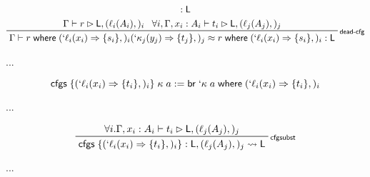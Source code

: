 \documentclass[acmsmall,screen,review]{acmart}
\newcommand{\ms}[1]{\ensuremath{\mathsf{#1}}}
\newcommand{\lbl}[1]{{`#1}}
\newcommand{\lto}{\Rightarrow}
\newcommand{\brb}[2]{\ms{br}\;#1\;#2}
\newcommand{\lbrb}[2]{\brb{\lbl{#1}}{#2}}
\newcommand{\where}[2]{#1\;\ms{where}\;#2}
\newcommand{\wbranch}[3]{#1(#2) \lto \{#3\}}
\newcommand{\lwbranch}[3]{\wbranch{\lbl{#1}}{#2}{#3}}
\newcommand{\cfgsubst}[1]{\ms{cfgs}\;\{#1\}}
\newcommand{\bhyp}[2]{#1 : #2}
\newcommand{\lhyp}[2]{#1(#2)}
\newcommand{\rle}[1]{{\scriptsize\textsf{#1}}}
\newcommand{\haslb}[3]{#1 \vdash #2 \rhd #3}
\newcommand{\lbsubst}[3]{#1: #2 \rightsquigarrow #3}
\newcommand{\teqv}{\approx}
\newcommand{\lbeq}[4]{#1 \vdash #2 \teqv #3 : {#4}}
\begin{document}
\begin{gather*}
{{          : \ms{L}}
      }
    \\
    \prftree[r]{\rle{dead-cfg}}
      {\haslb{\Gamma}{r}{\ms{L}, (\lhyp{\ell_i}{A_i},)_i}}
      {\forall i, \haslb{\Gamma, \bhyp{x_i}{A_i}}{t_i}{\ms{L}, (\lhyp{\ell_j}{A_j},)_j}}
      {\lbeq{\Gamma}{\where{r}{
          (\lwbranch{\ell_i}{x_i}{s_i},)_i
          (\lwbranch{\kappa_j}{y_j}{t_j},)_j}}
        {\where{r}{(\lwbranch{\ell_i}{x_i}{s_i},)_i}}{\ms{L}}}
\end{gather*}

...

\begin{equation*}
  \cfgsubst{(\lwbranch{\ell_i}{x_i}{t_i},)_i}\;\kappa\;a
  := \where{\lbrb{\kappa}{a}}{(\lwbranch{\ell_i}{x_i}{t_i},)_i}
\end{equation*}

...

\begin{equation*}
  \prftree[r]{\rle{cfgsubst}}
    {\forall i. \haslb{\Gamma, \bhyp{x_i}{A_i}}{t_i}{\ms{L}, (\lhyp{\ell_j}{A_j},)_j}}
    {\lbsubst{\cfgsubst{(\lwbranch{\ell_i}{x_i}{t_i},)_i}}{\ms{L}, (\lhyp{\ell_j}{A_j},)_j}{\ms{L}}}
\end{equation*}

...
\end{document}
